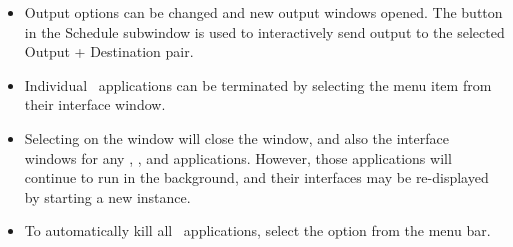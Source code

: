 \begin{list}{}{\setlength{\labelwidth}{0pt}
               \setlength{\leftmargin}{0pt}
               \setlength{\rightmargin}{\leftmargin}
               \setlength{\itemsep}{0pt}}
\begin{description}
\begin{itemize}
\begin{itemize}
         \item {\bf Run:}    Step through all stages until all complete.
         \item {\bf Relax:}  Run until the current stage termination
                             criteria are met.
         \item {\bf Step:}   Do one solver iteration and then pause.
         \item {\bf Pause:}  Click anytime to stop the solver.  Continue
             simulation from paused point with ,  or
             .
         \item {\bf Stage:}  Interactively change the current stage
             index by either typing the desired stage number (counting
             from 0) into the  entry box or by moving the
             associated slider.
       \end{itemize}
       \item Output options can be changed and new output windows
             opened.  The  button in the  Schedule
             subwindow is used to interactively send output to the
             selected Output + Destination pair.
    \end{itemize}
  \end{description}
  \item {}
  \begin{itemize}
    \item Individual \OOMMF\ applications can be terminated by selecting 
       the  menu item from their interface window.
    \item Selecting  on the  window
       will close the  window, and also the interface
       windows for any , , and 
       applications.  However, those applications will continue to run
       in the background, and their interfaces may be re-displayed by
       starting a new  instance.
    \item To automatically kill all \OOMMF\ applications, select the
        option from the 
       menu bar.
  \end{itemize}
\end{list}
